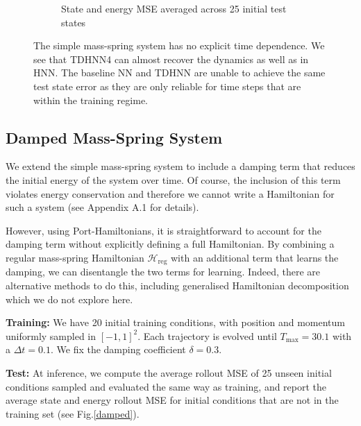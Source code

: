 \documentclass[twoside]{article}
\begin{document}
\begin{figure}[h!]
\begin{subfigure}[b]{0.48\textwidth}
		\caption{State and energy MSE averaged across 25 initial test states}
	\end{subfigure}
\caption{The simple mass-spring system has no explicit time dependence. We see that TDHNN4 can almost recover the dynamics as well as in HNN. The baseline NN and TDHNN are unable to achieve the same test state error as they are only reliable for time steps that are within the training regime.}
\label{mspring}
\end{figure}


\subsection{Damped Mass-Spring System}

We extend the simple mass-spring system to include a damping term that reduces the initial energy of the system over time. Of course, the inclusion of this term violates energy conservation and therefore we cannot write a Hamiltonian for such a system (see Appendix A.1 for details). 

However, using Port-Hamiltonians, it is straightforward to account for the damping term without explicitly defining a full Hamiltonian. By combining a regular mass-spring Hamiltonian $\mathcal{H}_{\mathrm{reg}}$ with an additional term that learns the damping, we can disentangle the two terms for learning. Indeed, there are alternative methods to do this, including generalised Hamiltonian decomposition which we do not explore here.

\textbf{Training:} We have 20 initial training conditions, with position and momentum uniformly sampled in $[-1,1]^2$. Each trajectory is evolved until $T_{\max} = 30.1$ with a $\Delta t = 0.1$. We fix the damping coefficient $\delta = 0.3$.

\textbf{Test:} At inference, we compute the average rollout MSE of 25 unseen initial conditions sampled and evaluated the same way as training, and report the average state and energy rollout MSE for initial conditions that are not in the training set (see Fig.\ref{damped}).
\end{document}
